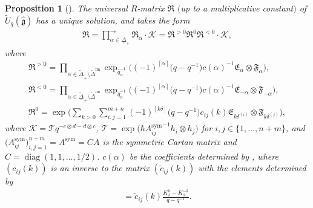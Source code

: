 \documentclass[10pt,a4paper]{amsart}
\numberwithin{equation}{section}
\newtheorem{Proposition}[Theorem]{Proposition}
 { \theoremstyle{definition}
\newtheorem{Definition}[Theorem]{Definition}
\newtheorem{Note}[Theorem]{Note}
\newtheorem{Example}[Theorem]{Example}
\newtheorem{Remark}[Theorem]{Remark} }
\begin{document}
\begin{Proposition}[{\cite[Theorem 4.1]{SMVN}}]\label{URD}
The universal $R$-matrix $\mathfrak{R}$ $($up to a multiplicative con\-stant$)$ of $\widetilde{U}_q(\mathfrak{\hat{g}})$ has a unique solution, and takes the form
\begin{gather*}
 \mathfrak{R}=\prod\limits_{\alpha\in\widetilde{\underline{\Delta}}_+ }^{\rightarrow}\mathfrak{R}_{\alpha}\cdot \mathcal{K}=\mathfrak{R}^{>0}\mathfrak{R}^{0}\mathfrak{R}^{<0}\cdot \mathcal{K},
\end{gather*}
where
\begin{gather*}
 \mathfrak{R}^{>0}=\prod\limits_{\alpha\in\widetilde{\underline{\Delta}}_+\setminus\widetilde{\Delta}^{\text{im}} }\exp_{\hat{q}_{\alpha}^{-1}}\bigl((-1)^{[\alpha]}\bigl(q-q^{-1}\bigr)c(\alpha)^{-1}\mathfrak{E}_{\alpha}\otimes \mathfrak{F}_{\alpha}\bigr), \\
 \mathfrak{R}^{<0}=\prod\limits_{\alpha\in\widetilde{\underline{\Delta}}_+\setminus\widetilde{\Delta}^{\text{im}} }\exp_{\hat{q}_{\alpha}^{-1}}\bigl((-1)^{[\alpha]}\bigl(q-q^{-1}\bigr)c(\alpha)^{-1}\mathfrak{E}_{-\alpha}\otimes \mathfrak{F}_{-\alpha}\bigr),\\
 \mathfrak{R}^{0}=\exp\Biggl(\sum\limits_{k>0}\sum\limits_{i,j=1}^{m+n}(-1)^{[k\delta]}\bigl(q-q^{-1}\bigr)c_{ij}(k)\mathfrak{E}_{k\delta^{(i)}}\otimes \mathfrak{F}_{k\delta^{(j)}}\Biggr),
\end{gather*}
where $\mathcal{K}=\mathcal{T}q^{-c\otimes d-d\otimes c}$, $\mathcal{T}=\exp\bigl(\hbar {A_{ij}^{\operatorname{sym}}}^{-1}h_i\otimes h_j\bigr)$ for $i,j\in\{1,\dots,n+m\}$, and $\bigl(A_{ij}^{\operatorname{sym}}\bigr)_{i,j=1}^{n+m}=A^{\operatorname{sym}}=CA$ is the symmetric Cartan matrix and $C=\operatorname{diag}(1, 1,\dots,1/2)$.
 $c(\alpha)$ be the coefficients determined by , where
$(c_{ij}(k))$ is an inverse to the matrix $(\tilde{c}_{ij}(k))$ with the elements determined by
\begin{gather*}
[\mathfrak{E}_{k\delta^{(i)}}, \mathfrak{F}_{k\delta^{(j)}}]=\tilde{c}_{ij}(k)\frac{K_{\delta}^k-K_{\delta}^{-k}}{q-q^{-1}}.
\end{gather*}
\end{Proposition}
\end{document}
